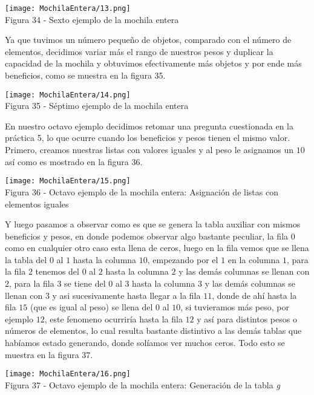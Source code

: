 \documentclass[12pt,twoside]{article}
\begin{document}
\begin{center}
    \texttt{[image: MochilaEntera/13.png]}\\
    Figura 34 - Sexto ejemplo de la mochila entera
\end{center}
Ya que tuvimos un número pequeño de objetos, comparado con el número de elementos, decidimos variar más el rango de nuestros pesos y duplicar la capacidad de la mochila y obtuvimos efectivamente más objetos y por ende más beneficios, como se muestra en la figura 35.
\begin{center}
    \texttt{[image: MochilaEntera/14.png]}\\
    Figura 35 - Séptimo ejemplo de la mochila entera
\end{center}
En nuestro octavo ejemplo decidimos retomar una pregunta cuestionada en la práctica 5, lo que ocurre cuando los beneficios y pesos tienen el mismo valor. Primero, creamos nuestras listas con valores iguales y al peso le asignamos un $10$ así como es mostrado en la figura 36.
\begin{center}
    \texttt{[image: MochilaEntera/15.png]}\\
    Figura 36 - Octavo ejemplo de la mochila entera: Asignación de listas con elementos iguales
\end{center}
Y luego pasamos a observar como es que se genera la tabla auxiliar con mismos beneficios y pesos, en donde podemos observar algo bastante peculiar, la fila 0 como en cualquier otro caso esta llena de ceros, luego en la fila vemos que se llena la tabla del $0$ al $1$ hasta la columna $10$, empezando por el $1$ en la columna $1$, para la fila $2$ tenemos del $0$ al $2$ hasta la columna $2$ y las demás columnas se llenan con $2$, para la fila $3$ se tiene del $0$ al $3$ hasta la columna $3$ y las demás columnas se llenan con $3$ y asi sucesivamente hasta llegar a la fila $11$, donde de ahí hasta la fila $15$ (que es igual al peso) se llena del $0$ al $10$, si tuvieramos más peso, por ejemplo $12$, este fenomeno ocurriría hasta la fila $12$ y así para distintos pesos o números de elementos, lo cual resulta bastante distintivo a las demás tablas que habíamos estado generando, donde solíamos ver muchos ceros. Todo esto se muestra en la figura 37.
\begin{center}
    \texttt{[image: MochilaEntera/16.png]}\\
    Figura 37 - Octavo ejemplo de la mochila entera: Generación de la tabla \textit{g}
\end{center}
\end{document}
